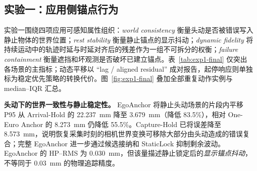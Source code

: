 \documentclass[9pt,twocolumn,letterpaper]{extarticle}
\begin{document}
\subsection{实验一：应用侧锚点行为}

实验一围绕四项应用可感知属性组织：\emph{world consistency} 衡量头动是否被错误写入静止物体的世界位置；\emph{rest stability} 衡量静止锚点的显示抖动；\emph{dynamic fidelity} 将持续运动中的轨迹时延与时延对齐后的残差作为一组不可拆分的权衡；\emph{failure containment} 衡量遮挡和坏观测是否破坏已建立锚点。表~\ref{tab:exp1-final} 仅突出各场景的主指标；动态平移以 ``lag / aligned residual'' 成对报告，起停响应则单独标为稳定优先策略的转换代价。图~\ref{fig:exp1-final} 叠加全部重复动作实例与 median--IQR 汇总。

\begin{table}[t]
\centering
\caption{实验一的片段级系统表征，数值为重复动作片段或遮挡过程的 median。粗体仅标记各应用能力的主指标最优值；动态平移中的有效时延与 lag-aligned residual 必须联合解释，其中仅突出 residual。最右列是稳定优先策略的\emph{转换代价}，不参与主收益排名。完整 IQR 与片段分布见图~\ref{fig:exp1-final}。}
\label{tab:exp1-final}
\scriptsize
\setlength{\tabcolsep}{4.2pt}
\end{table}

\textbf{头动下的世界一致性与静止稳定性。}
EgoAnchor 将静止头动场景的片段内平移 P95 从 Arrival-Hold 的 22.237~mm 降至 3.679~mm（降低 83.5\%），相对 One-Euro Anchor 的 8.273~mm 仍降低 55.5\%。Capture-Hold 已将误差降至 8.573~mm，说明恢复采集时刻的相机世界变换可移除大部分由头动造成的错误复合；完整 EgoAnchor 进一步通过候选接纳和 StaticLock 抑制剩余波动。EgoAnchor 的 HP--RMS 为 0.030~mm，但该量描述静止锁定后的\emph{显示锚点抖动}，不等同于 0.03~mm 的物理追踪精度。
\end{document}
